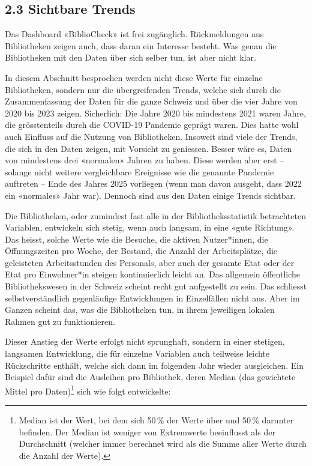 \documentclass[a4paper,
fontsize=11pt,
oneside,
numbers=noperiodatend,
parskip=half-,
bibliography=totoc,
final
]{scrartcl}
\begin{document}
\subsection{2.3 Sichtbare Trends}\label{sichtbare-trends}

Das Dashboard «BiblioCheck» ist frei zugänglich. Rückmeldungen aus
Bibliotheken zeigen \linebreak auch, dass daran ein Interesse besteht. Was genau
die Bibliotheken mit den Daten über sich selber tun, ist aber nicht
klar.

In diesem Abschnitt besprochen werden nicht diese Werte für einzelne
Bibliotheken, sondern nur die übergreifenden Trends, welche sich durch
die Zusammenfassung der Daten für die ganze Schweiz und über die vier
Jahre von 2020 bis 2023 zeigen. Sicherlich: Die Jahre 2020 bis
mindestens 2021 waren Jahre, die grösstenteils durch die COVID-19
Pandemie geprägt waren. Dies hatte wohl auch Einfluss auf die Nutzung
von Bibliotheken. Insoweit sind viele der Trends, die sich in den Daten
zeigen, mit Vorsicht zu geniessen. Besser wäre es, Daten von mindestens
drei «normalen» Jahren zu haben. Diese werden aber erst -- solange nicht
weitere vergleichbare Ereignisse wie die genannte Pandemie auftreten --
Ende des Jahres 2025 vorliegen (wenn man davon ausgeht, dass 2022 ein
«normales» Jahr war). Dennoch sind aus den Daten einige Trends sichtbar.

Die Bibliotheken, oder zumindest fast alle in der Bibliotheksstatistik
betrachteten Variablen, entwickeln sich stetig, wenn auch langsam, in
eine «gute Richtung». Das heisst, solche Werte wie die Besuche, die
aktiven Nutzer*innen, die Öffnungszeiten pro Woche, der Bestand, die
Anzahl der Arbeitsplätze, die geleisteten Arbeitsstunden des Personals,
aber auch der gesamte Etat oder der Etat pro Einwohner*in steigen
kontinuierlich leicht an. Das allgemein öffentliche Bibliothekswesen in
der Schweiz scheint recht gut aufgestellt zu sein. Das schliesst
selbstverständlich gegenläufige Entwicklungen in Einzelfällen nicht aus.
Aber im Ganzen scheint das, was die Bibliotheken tun, in ihrem
jeweiligen lokalen Rahmen gut zu funktionieren.

Dieser Anstieg der Werte erfolgt nicht sprunghaft, sondern in einer
stetigen, langsamen Entwicklung, die für einzelne Variablen auch
teilweise leichte Rückschritte enthält, welche sich dann im folgenden
Jahr wieder ausgleichen. Ein Beispiel dafür sind die Ausleihen pro
Bibliothek, deren Median (das gewichtete Mittel pro Daten)\footnote{Median
  ist der Wert, bei dem sich 50\,\% der Werte über und 50\,\% darunter
  befinden. Der Median ist weniger von Extremwerte beeinflusst als der
  Durchschnitt (welcher immer berechnet wird als die Summe aller Werte
  durch die Anzahl der Werte).} sich wie folgt entwickelte:
\end{document}
